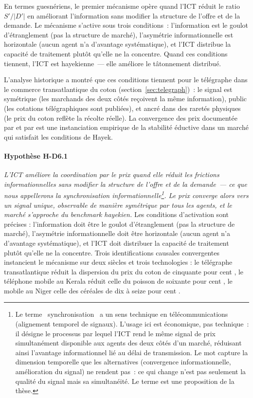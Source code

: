 En termes guesnériens, le premier mécanisme opère quand l'ICT réduit le ratio $S'/|D'|$ en améliorant l'information sans modifier la structure de l'offre et de la demande. Le mécanisme s'active sous trois conditions~: l'information est le goulot d'étranglement (pas la structure de marché), l'asymétrie informationnelle est horizontale (aucun agent n'a d'avantage systématique), et l'ICT distribue la capacité de traitement plutôt qu'elle ne la concentre. Quand ces conditions tiennent, l'ICT est hayekienne~--- elle améliore le tâtonnement distribué.

L'analyse historique a montré que ces conditions tiennent pour le télégraphe dans le commerce transatlantique du coton (section~\ref{sec:telegraph})~: le signal est symétrique (les marchands des deux côtés reçoivent la même information), public (les cotations télégraphiques sont publiées), et ancré dans des raretés physiques (le prix du coton reflète la récolte réelle). La convergence des prix documentée par \textcite{steinwender_real_2018} et par \textcite{ejrnaes_gains_2010} est une instanciation empirique de la stabilité éductive dans un marché qui satisfait les conditions de Hayek.


\paragraph{Hypothèse H-D6.1} \emph{L'ICT améliore la coordination par le prix quand elle réduit les frictions informationnelles sans modifier la structure de l'offre et de la demande~--- ce que nous appellerons la \emph{synchronisation informationnelle}\footnote{Le terme \og~synchronisation~\fg{} a un sens technique en télécommunications (alignement temporel de signaux). L'usage ici est économique, pas technique~: il désigne le processus par lequel l'ICT rend le même signal de prix simultanément disponible aux agents des deux côtés d'un marché, réduisant ainsi l'avantage informationnel lié au délai de transmission. Le mot capture la dimension temporelle que les alternatives (convergence informationnelle, amélioration du signal) ne rendent pas~: ce qui change n'est pas seulement la qualité du signal mais sa simultanéité. Le terme est une proposition de la thèse.}. Le prix converge alors vers un signal unique, observable de manière symétrique par tous les agents, et le marché s'approche du \emph{benchmark} hayekien.} Les conditions d'activation sont précises : l'information doit être le goulot d'étranglement (pas la structure de marché), l'asymétrie informationnelle doit être horizontale (aucun agent n'a d'avantage systématique), et l'ICT doit distribuer la capacité de traitement plutôt qu'elle ne la concentre. Trois identifications causales convergentes instancient le mécanisme sur deux siècles et trois technologies : le télégraphe transatlantique réduit la dispersion du prix du coton de cinquante pour cent \parencite{steinwender_real_2018}, le téléphone mobile au Kerala réduit celle du poisson de soixante pour cent \parencite{jensen_digital_2007}, le mobile au Niger celle des céréales de dix à seize pour cent \parencite{aker_information_2010}.

